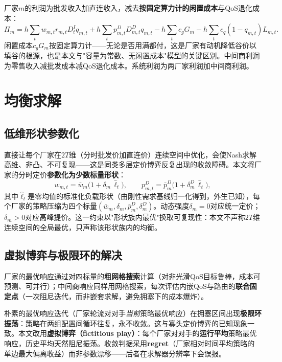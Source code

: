 \documentclass[UTF8,11pt]{ctexart}
\newcommand{\D}{D}
\begin{document}
厂家$m$的利润为批发收入加直连收入，减去\textbf{按固定算力计的闲置成本}与QoS退化成本：
\begin{equation}
  \Pi_m=h\!\sum_t\! w_{m,t}r_{m,t}\D^I_t q_{m,t}
  +h\!\sum_t\! p^D_{m,t}\D^D_{m,t}q_{m,t}
  -h\!\sum_t\! c_g G_m
  -h\!\sum_t\! c_q(1-q_{m,t})L_{m,t}.
  \label{eq:firm_profit}
\end{equation}
闲置成本$c_g G_m$按固定算力计——无论是否用满都付，这是厂家有动机降低谷价以填谷的根源，也是本文与"容量为常数、无闲置成本"模型的关键区别。中间商利润为零售收入减批发成本减QoS退化成本。系统利润为两厂家利润加中间商利润。


\section{均衡求解}
\label{sec:solver}

\subsection{低维形状参数化}

直接让每个厂家在$2T$维（分时批发价加直连价）连续空间中优化，会使Nash求解高维、非凸、不可复现——这是同类多层定价博弈反复出现的收敛障碍。本文将厂家的分时定价\textbf{参数化为少数标量形状}：
\begin{equation}
  w_{m,t}=\bar w_m\big(1+\delta_m\,\widehat{\ell}_t\big),\qquad
  p^D_{m,t}=\bar p^D_m\big(1+\delta^D_m\,\widehat{\ell}_t\big),
  \label{eq:shape}
\end{equation}
其中$\widehat{\ell}_t$是零均值的标准化负载形状（由刚性需求基线归一化得到，外生已知），每个厂家的策略压缩为四个标量$(\bar w_m,\delta_m,\bar p^D_m,\delta^D_m)$。动态强度$\delta_m=0$对应统一定价；$\delta_m>0$对应高峰提价。这一约束以"形状族内最优"换取可复现性：本文不声称$2T$维连续空间的全局最优，只声称该形状族内的均衡。

\subsection{虚拟博弈与极限环的解决}

厂家的最优响应通过对四标量的\textbf{粗网格搜索}计算（对非光滑QoS目标鲁棒，成本可预测、可并行）；中间商响应同样用网格搜索，每次评估内嵌QoS与路由的\textbf{联合固定点}（一次阻尼迭代，而非嵌套求解，避免拥塞下的成本爆炸）。

朴素的最优响应迭代（厂家轮流对对手\emph{当前}策略最优响应）在拥塞区间出现\textbf{极限环振荡}：策略在两组配置间循环往复，永不收敛。这与寡头定价博弈的已知现象一致。本文改用\textbf{虚拟博弈（fictitious play）}：每个厂家对对手的\textbf{运行平均}策略最优响应，历史平均天然阻尼振荡。收敛判据采用\textbf{regret}（厂家相对时间平均策略的单边最大偏离收益）而非参数漂移——后者在求解器分辨率下会误报。
\end{document}
